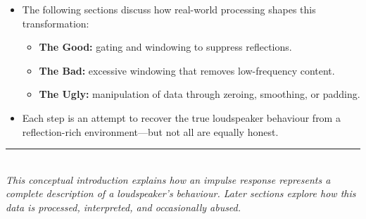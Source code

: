 \documentclass[12pt,a4paper]{article}
\begin{document}
\begin{itemize}[noitemsep]
    \item The following sections discuss how real-world processing shapes this transformation:
    \begin{itemize}
        \item \textbf{The Good:} gating and windowing to suppress reflections.
        \item \textbf{The Bad:} excessive windowing that removes low-frequency content.
        \item \textbf{The Ugly:} manipulation of data through zeroing, smoothing, or padding.
    \end{itemize}
    \item Each step is an attempt to recover the true loudspeaker behaviour from a reflection-rich environment—but not all are equally honest.
\end{itemize}

\vspace{1em}
\noindent\rule{\textwidth}{0.4pt}\\
\textit{This conceptual introduction explains how an impulse response represents a complete description of a loudspeaker’s behaviour. Later sections explore how this data is processed, interpreted, and occasionally abused.}
\end{document}
